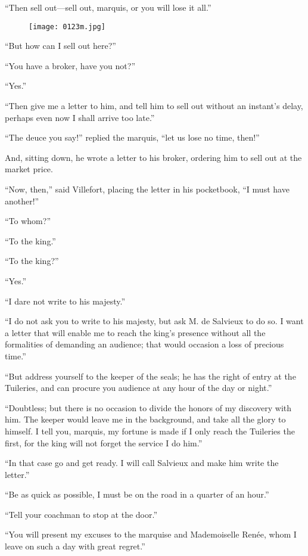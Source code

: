“Then sell out—sell out, marquis, or you will lose it all.”

\begin{figure}[ht]
\texttt{[image: 0123m.jpg]}
\end{figure}

“But how can I sell out here?”

“You have a broker, have you not?”

“Yes.”

“Then give me a letter to him, and tell him to sell out without an
instant’s delay, perhaps even now I shall arrive too late.”

“The deuce you say!” replied the marquis, “let us lose no time, then!”

And, sitting down, he wrote a letter to his broker, ordering him to
sell out at the market price.

“Now, then,” said Villefort, placing the letter in his pocketbook, “I
must have another!”

“To whom?”

“To the king.”

“To the king?”

“Yes.”

“I dare not write to his majesty.”

“I do not ask you to write to his majesty, but ask M. de Salvieux to do
so. I want a letter that will enable me to reach the king’s presence
without all the formalities of demanding an audience; that would
occasion a loss of precious time.”

“But address yourself to the keeper of the seals; he has the right of
entry at the Tuileries, and can procure you audience at any hour of the
day or night.”

“Doubtless; but there is no occasion to divide the honors of my
discovery with him. The keeper would leave me in the background, and
take all the glory to himself. I tell you, marquis, my fortune is made
if I only reach the Tuileries the first, for the king will not forget
the service I do him.”

“In that case go and get ready. I will call Salvieux and make him write
the letter.”

“Be as quick as possible, I must be on the road in a quarter of an
hour.”

“Tell your coachman to stop at the door.”

“You will present my excuses to the marquise and Mademoiselle Renée,
whom I leave on such a day with great regret.”

